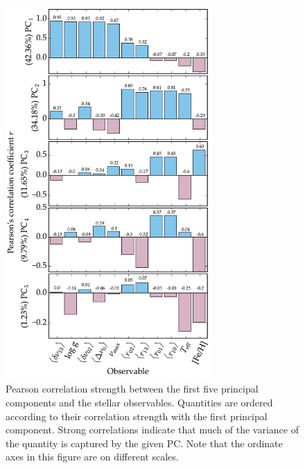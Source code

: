 \begin{figure} \centering
\includegraphics[width=0.7\textwidth]{barchart2a.pdf}%
\caption[Correlation between principal components and stellar observables]{ Pearson correlation strength between the first five principal components and the stellar observables.  Quantities are ordered according to their correlation strength with the first principal component.  Strong correlations indicate that much of the variance of the quantity is captured by the given PC. Note that the ordinate axes in this figure are on different scales. }
\label{fig:GCA-pcabar}
\end{figure}

